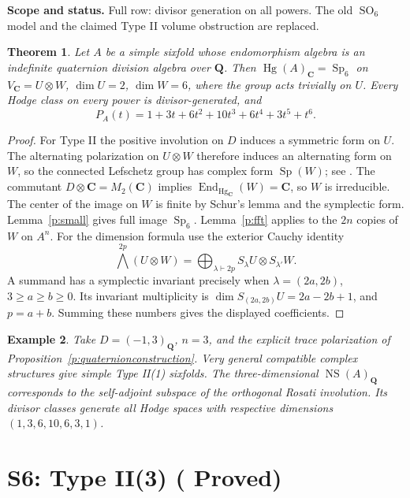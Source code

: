 \documentclass[10pt,reqno]{article}
\theoremstyle{emphasizedplain}
\DeclareRobustCommand{\provedstatus}{%
  \texorpdfstring{\textcolor{ProvedGreen}{\textbf{Proved}}}{Proved}}
\newtheorem{theorem}{Theorem}[section]
\theoremstyle{emphasizeddefinition}
\newtheorem{example}[theorem]{Example}
\theoremstyle{emphasizeddefinition}
\DeclareMathOperator{\End}{End}
\DeclareMathOperator{\Hg}{Hg}
\DeclareMathOperator{\Sp}{Sp}
\DeclareMathOperator{\SO}{SO}
\DeclareMathOperator{\NS}{NS}
\newcommand{\Q}{\mathbf Q}
\newcommand{\C}{\mathbf C}
\newcommand{\status}[1]{%
  \par\nobreak\smallskip\noindent
  {\setlength{\fboxsep}{7pt}%
   \colorbox{ScopeBackground}{%
    \parbox{\dimexpr\linewidth-2\fboxsep\relax}{%
     \small\textbf{\textcolor{HeadingInk}{Scope and status.}} #1}}}%
  \par\nobreak\medskip}
\renewcommand{\small}{\fontsize{8.4}{10}\selectfont}
\begin{document}
\status{Full row: divisor generation on all powers. The old $\SO_6$
model and the claimed Type II volume obstruction are replaced.}
\begin{theorem}
Let $A$ be a simple sixfold whose endomorphism algebra is an indefinite
quaternion division algebra over $\Q$. Then $\Hg(A)_\C=\Sp_6$ on
$V_\C=U\otimes W$, $\dim U=2$, $\dim W=6$, where the group acts trivially
on $U$. Every Hodge class on every power is divisor-generated, and
\[
 P_A(t)=1+3t+6t^2+10t^3+6t^4+3t^5+t^6.
\]
\end{theorem}
\begin{proof}
For Type II the positive involution on $D$ induces a symmetric form on
$U$. The alternating polarization on $U\otimes W$ therefore induces an
alternating form on $W$, so the connected Lefschetz group has complex form
$\Sp(W)$; see \cite[\S3.2]{Vial}.
The commutant $D\otimes\C=M_2(\C)$ implies $\End_{\Hg_\C}(W)=\C$,
so $W$ is irreducible. The center of the image on $W$ is finite by
Schur's lemma and the symplectic form. Lemma~\ref{p:small} gives full image
$\Sp_6$. Lemma~\ref{p:fft} applies to the $2n$ copies of $W$ on $A^n$.
For the dimension formula use the exterior Cauchy identity
\[
 \bigwedge^{2p}(U\otimes W)
   =\bigoplus_{\lambda\vdash2p} S_\lambda U\otimes S_{\lambda'}W.
\]
A summand has a symplectic invariant precisely when
$\lambda=(2a,2b)$, $3\geq a\geq b\geq0$. Its invariant multiplicity is
$\dim S_{(2a,2b)}U=2a-2b+1$, and $p=a+b$.
Summing these numbers gives the displayed coefficients.
\end{proof}
\begin{example}
Take $D=(-1,3)_\Q$, $n=3$, and the explicit trace polarization of
Proposition~\ref{p:quaternionconstruction}. Very general compatible
complex structures give simple Type II(1) sixfolds. The three-dimensional
$\NS(A)_\Q$ corresponds to the self-adjoint subspace of the orthogonal
Rosati involution. Its divisor classes generate all Hodge spaces with
respective dimensions $(1,3,6,10,6,3,1)$.
\end{example}
\section{S6: Type II(3) (\provedstatus)}\label{sec:S6}
\end{document}

